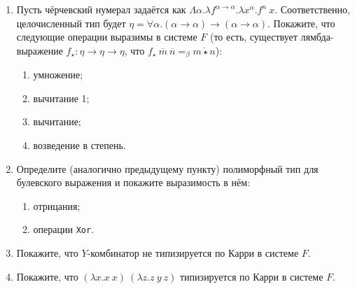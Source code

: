\documentclass[10pt,a4paper,oneside]{article}
\begin{document}
\begin{enumerate}
\item Пусть чёрчевский нумерал задаётся как $\Lambda\alpha.\lambda f^{\alpha\rightarrow\alpha}.\lambda x^\alpha.f^n\ x$.
Соответственно, целочисленный тип будет $\eta = \forall\alpha.(\alpha\rightarrow\alpha)\rightarrow(\alpha\rightarrow\alpha)$.
Покажите, что следующие операции выразимы в системе $F$ (то есть, существует лямбда-выражение $f_\star: \eta\rightarrow\eta\rightarrow\eta$,
что $f_\star\ \overline{m}\ \overline{n} =_\beta \overline{m \star n}$):
\begin{enumerate}
\item умножение;
\item вычитание 1;
\item вычитание;
\item возведение в степень.
\end{enumerate}
\item Определите (аналогично предыдущему пункту) полиморфный тип для булевского выражения и покажите выразимость
в нём:
\begin{enumerate}
\item отрицания;
\item операции \verb!Xor!.
\end{enumerate}
\item Покажите, что $Y$-комбинатор не типизируется по Карри в системе $F$.
\item Покажите, что $(\lambda x.x\ x)\ (\lambda z.z\ y\ z)$ типизируется по Карри в системе $F$.
\end{enumerate}
\end{document}

